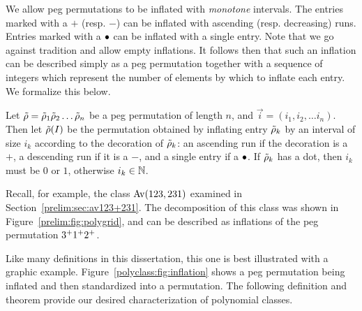     We allow peg permutations to be inflated with \emph{monotone} intervals. The
    entries marked with a $+$ (resp. $-$) can be inflated with ascending (resp.
    decreasing) runs. Entries marked with a $\bullet$ can be inflated with a single
    entry. Note that we go against tradition and allow empty inflations. It
    follows then that such an inflation can be described simply as a peg
    permutation together with a sequence of integers which represent the number of
    elements by which to inflate each entry. We formalize this below. 

    \begin{definition} \label{polyclass:def:inflation}
      Let $\tilde{\rho} = \tilde{\rho}_1 \tilde{\rho}_2 \dots \tilde{\rho}_n$ be a peg permutation of length
      $n$, and $\vec i = (i_1, i_2, \dots i_n)$. Then let $\tilde{\rho}(I)$ be the
      permutation obtained by inflating entry $\tilde{\rho}_k$ by an interval of size
      $i_k$ according to the decoration of $\tilde{\rho}_k$: an ascending run if the
      decoration is a $+$, a descending run if it is a $-$, and a single entry if
      a $\bullet$. If $\tilde{\rho}_k$ has a dot, then $i_k$ must be $0$ or $1$, otherwise
      $i_k \in \mathbb{N}$. 
    \end{definition}

    
    Recall, for example, the class $\operatorname{{Av}}(123, 231)$ examined in
    Section~\ref{prelim:sec:av123+231}. The decomposition of this class was
    shown in Figure~\ref{prelim:fig:polygrid}, and can be described as
    inflations of the peg permutation $3^+ 1^+ 2^+$. 

    Like many definitions in this dissertation, this one is best illustrated with
    a graphic example. Figure~\ref{polyclass:fig:inflation} shows a peg
    permutation being inflated and then standardized into a permutation. The
    following definition and theorem provide our desired characterization of
    polynomial classes. 

